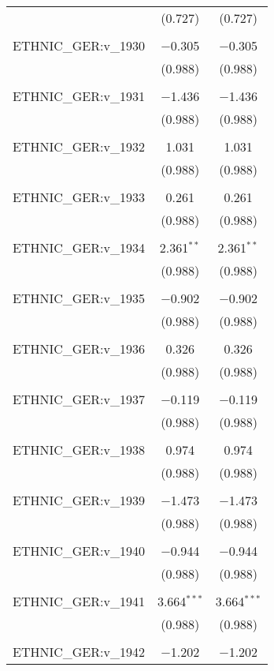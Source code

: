\begin{table}[!htbp]
\begin{tabular}{@{\extracolsep{5pt}}lcc}
  & (0.727) & (0.727) \\ 
  & & \\ 
 ETHNIC\_GER:v\_1930 & $-$0.305 & $-$0.305 \\ 
  & (0.988) & (0.988) \\ 
  & & \\ 
 ETHNIC\_GER:v\_1931 & $-$1.436 & $-$1.436 \\ 
  & (0.988) & (0.988) \\ 
  & & \\ 
 ETHNIC\_GER:v\_1932 & 1.031 & 1.031 \\ 
  & (0.988) & (0.988) \\ 
  & & \\ 
 ETHNIC\_GER:v\_1933 & 0.261 & 0.261 \\ 
  & (0.988) & (0.988) \\ 
  & & \\ 
 ETHNIC\_GER:v\_1934 & 2.361$^{**}$ & 2.361$^{**}$ \\ 
  & (0.988) & (0.988) \\ 
  & & \\ 
 ETHNIC\_GER:v\_1935 & $-$0.902 & $-$0.902 \\ 
  & (0.988) & (0.988) \\ 
  & & \\ 
 ETHNIC\_GER:v\_1936 & 0.326 & 0.326 \\ 
  & (0.988) & (0.988) \\ 
  & & \\ 
 ETHNIC\_GER:v\_1937 & $-$0.119 & $-$0.119 \\ 
  & (0.988) & (0.988) \\ 
  & & \\ 
 ETHNIC\_GER:v\_1938 & 0.974 & 0.974 \\ 
  & (0.988) & (0.988) \\ 
  & & \\ 
 ETHNIC\_GER:v\_1939 & $-$1.473 & $-$1.473 \\ 
  & (0.988) & (0.988) \\ 
  & & \\ 
 ETHNIC\_GER:v\_1940 & $-$0.944 & $-$0.944 \\ 
  & (0.988) & (0.988) \\ 
  & & \\ 
 ETHNIC\_GER:v\_1941 & 3.664$^{***}$ & 3.664$^{***}$ \\ 
  & (0.988) & (0.988) \\ 
  & & \\ 
 ETHNIC\_GER:v\_1942 & $-$1.202 & $-$1.202 \\ 

\end{tabular}
\end{table}
